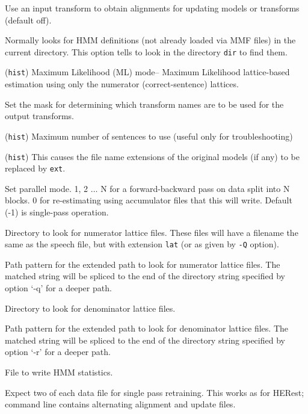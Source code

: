 \begin{optlist}

   Use an input transform to obtain alignments for updating
      models or transforms (default off).

      Normally  looks for HMM definitions
       (not already loaded via MMF files) 
      in the current directory.  This option tells  to look in
      the directory {\tt dir} to find them.

   (\texttt{hist}) Maximum Likelihood (ML) mode-- Maximum Likelihood lattice-based
   estimation using only the numerator (correct-sentence) lattices.

   Set the mask for determining which transform names are 
	to be used for the output transforms.

   (\texttt{hist}) Maximum number of sentences to use (useful only for troubleshooting)

   (\texttt{hist}) This causes the file name extensions of the
      original models (if any) to be replaced by {\tt ext}.

    Set parallel mode.  1, 2 $\ldots$ N for a forward-backward
     pass on data split into N blocks.  0 for re-estimating using accumulator
    files that this will write.  Default (-1) is single-pass operation.

     Directory to look for numerator lattice files.  These files
      will have a filename the same as the speech file, but with extension
      \texttt{lat} (or as given by \texttt{-Q} option).

     Path pattern for the extended path to look for numerator lattice files. 
      The matched string will be spliced to the end of the directory string specified by
      option `-q' for a deeper path.

    Directory to look for denominator lattice files.

     Path pattern for the extended path to look for denominator lattice files.
     The matched string will be spliced to the end of the directory string specified by
      option `-r' for a deeper path.

    File to write HMM statistics.

    Expect two of each data file for single pass retraining.  
    This works as for HERest; command line contains alternating alignment and update
    files.


\end{optlist}
